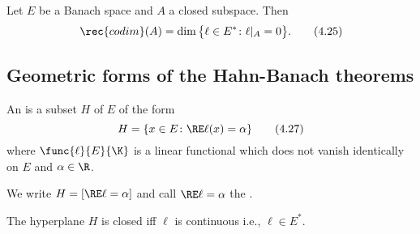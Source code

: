 \begin{thm}\label{iv.10}
    Let $E$ be a Banach space and $A$ a closed subspace. Then
    \[\rec{codim}(A)=\dim\big\{\ell\in E^*\colon\ell|_A=0\big\}.\tag{4.25}\label{4.25}\]
\end{thm}

\subsection{Geometric forms of the Hahn-Banach theorems}
\begin{definition}\label{iv.11}
    An  is a subset $H$ of $E$ of the form
    \[H=\{x\in E\colon\RE \ell(x)=\alpha\}\tag{4.27}\label{4.27}\]
    where $\func{\ell}{E}{\K}$ is a linear functional which does not vanish identically on $E$ and $\alpha\in\R$.
    
    We write $H=[\RE\ell=\alpha]$ and call $\RE\ell=\alpha$ the .
\end{definition}

\begin{lem}\label{iv.12}
    The hyperplane $H$ is closed iff $\ell$ is continuous \rec{(}i.e., $\ell\in E^*$\rec{)}.
\end{lem}

